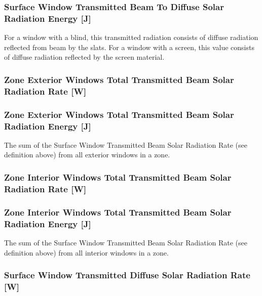 \subsubsection{Surface Window Transmitted Beam To Diffuse Solar Radiation Energy {[}J{]}}\label{surface-window-transmitted-beam-to-diffuse-solar-radiation-energy-j}

For a window with a blind, this transmitted radiation consists of diffuse radiation reflected from beam by the slats. For a window with a screen, this value consists of diffuse radiation reflected by the screen material.

\subsubsection{Zone Exterior Windows Total Transmitted Beam Solar Radiation Rate {[}W{]}}\label{zone-exterior-windows-total-transmitted-beam-solar-radiation-rate-w}

\subsubsection{Zone Exterior Windows Total Transmitted Beam Solar Radiation Energy {[}J{]}}\label{zone-exterior-windows-total-transmitted-beam-solar-radiation-energy-j}

The sum of the Surface Window Transmitted Beam Solar Radiation Rate (see definition above) from all exterior windows in a zone.

\subsubsection{Zone Interior Windows Total Transmitted Beam Solar Radiation Rate {[}W{]}}\label{zone-interior-windows-total-transmitted-beam-solar-radiation-rate-w}

\subsubsection{Zone Interior Windows Total Transmitted Beam Solar Radiation Energy {[}J{]}}\label{zone-interior-windows-total-transmitted-beam-solar-radiation-energy-j}

The sum of the Surface Window Transmitted Beam Solar Radiation Rate (see definition above) from all interior windows in a zone.

\subsubsection{Surface Window Transmitted Diffuse Solar Radiation Rate {[}W{]}}\label{surface-window-transmitted-diffuse-solar-radiation-rate-w}

